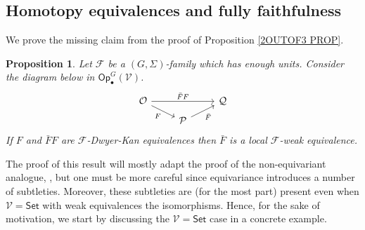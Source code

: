 \documentclass[a4paper,10pt
,draft
]{article}%
\numberwithin{equation}{section}
\numberwithin{figure}{section}
\newtheorem{proposition}[equation]{Proposition}%
\theoremstyle{definition} %
\newcommand{\F}{\ensuremath{\mathcal F}}
\newcommand{\V}{\ensuremath{\mathcal V}}
\renewcommand{\O}{\ensuremath{\mathcal O}}
\newcommand{\1}{\ensuremath{\mathbbm 1}}%
\begin{document}
\subsection{Homotopy equivalences and fully faithfulness}
\label{HMTYEQ SEC}

We prove the missing claim from the proof of Proposition \ref{2OUTOF3 PROP}.

\begin{proposition}\label{23HARDCASE PROP}
Let $\F$ be a $(G,\Sigma)$-family which has enough units. 
Consider the diagram below 
in $\mathsf{Op}^G_\bullet(\V)$.
\begin{equation}\label{23HARDDIAG EQ}
	\begin{tikzcd}[row sep=5pt]
		\O \arrow{rr}{\bar{F}F}
		\arrow{dr}[swap]{F}
	&&
		\mathcal{Q} 
	\\
	&
		\mathcal{P} \ar{ru}[swap]{\bar{F}}
	\end{tikzcd}
\end{equation}
If $F$ and $\bar{F}F$ are $\F$-Dwyer-Kan equivalences
then $\bar{F}$ is a local $\F$-weak equivalence.
\end{proposition}

The proof of this result will mostly adapt the proof of the non-equivariant analogue, \cite[Lemma 4.14]{Cav},
but one must be more careful since equivariance introduces a number of subtleties.
Moreover, these subtleties are (for the most part)
present even when $\V = \mathsf{Set}$
with weak equivalences the isomorphisms.
Hence, for the sake of motivation, 
we start by discussing the $\V = \mathsf{Set}$ case
in a concrete example.
\end{document}
